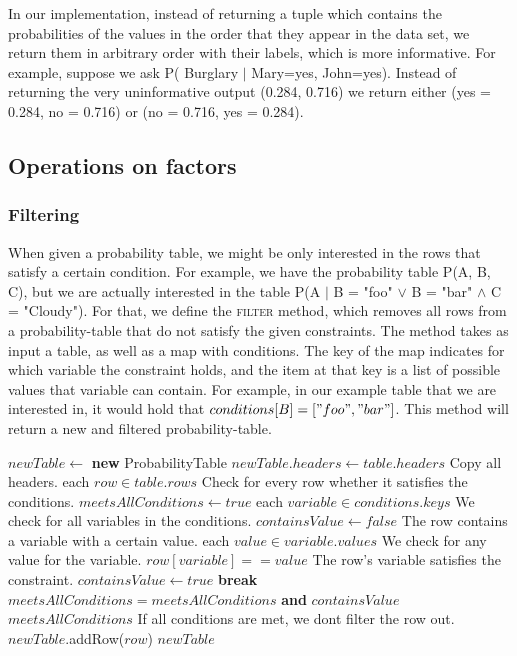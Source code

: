 \documentclass[10pt,a4paper]{article}
\begin{document}
In our implementation, instead of returning a tuple which contains the probabilities of the values in the order that they appear in the data set, we return them in arbitrary order with their labels, which is more informative. For example, suppose we ask P( Burglary $|$ Mary=yes, John=yes). Instead of returning the very uninformative output (0.284, 0.716) we return either (yes = 0.284, no = 0.716) or (no = 0.716, yes = 0.284).
\subsection{Operations on factors}
\subsubsection{Filtering}
When given a probability table, we might be only interested in the rows that satisfy a certain condition. For example, we have the probability table P(A, B, C), but we are actually interested in the table P(A $|$ B = "foo" $\vee$ B = "bar" $\wedge$ C = "Cloudy"). For that, we define the \textsc{filter} method, which removes all rows from a probability-table that do not satisfy the given constraints. The method takes as input a table, as well as a map with conditions. The key of the map indicates for which variable the constraint holds, and the item at that key is a list of possible values that variable can contain. For example, in our example table that we are interested in, it would hold that $conditions[B] = [ "foo", "bar" ]$. This method will return a new and filtered probability-table.
\begin{codebox}
\li $newTable \gets $ \textbf{new} ProbabilityTable
\li $newTable.headers \gets table.headers$ \Comment Copy all headers.
\zi
\li \For each $row \in table.rows$ \Comment Check for every row whether it satisfies the conditions. \Do
\li     $meetsAllConditions \gets true$
\li     \For each $variable \in conditions.keys$ \Comment We check for all variables in the conditions. \Do
\li         $containsValue \gets false$ \Comment The row contains a variable with a certain value.
\li         \For each $value \in variable.values$ \Comment We check for any value for the variable. \Do
\li             \If $row[variable] == value$ \Comment The row's variable satisfies the constraint. \Then
\li                 $containsValue \gets true$
\li                 \textbf{break}
                \End
            \End
\li         $meetsAllConditions = meetsAllConditions$ \textbf{and} $containsValue$
        \End
\zi
\li     \If $meetsAllConditions$ \Comment If all conditions are met, we dont filter the row out. \Then
\li         $newTable$.{\sc addRow}($row$)
        \End
    \End
\zi
\li \Return $newTable$
\end{codebox}
\end{document}
